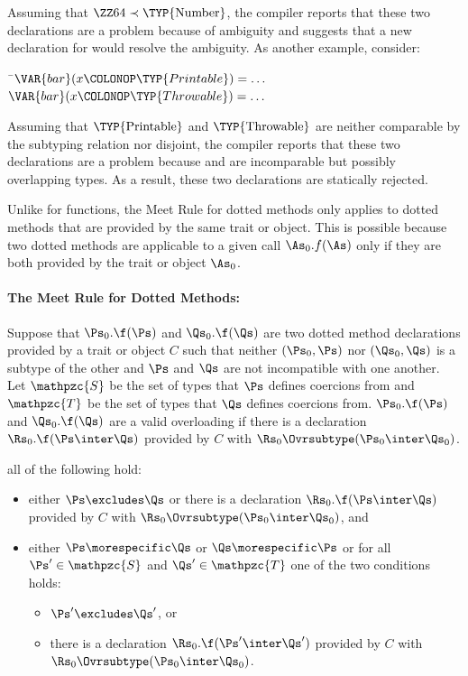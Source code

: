 Assuming that \(\hbox{\ZZ64} \prec \hbox{\TYP{Number}}\), the compiler
reports that these two declarations are a problem because of ambiguity
and suggests that a new declaration for  would resolve the ambiguity. As another example, consider:

\begin{Fortress}
{\tt~}\pushtabs\=\+\( \VAR{bar}(x\COLONOP\TYP{Printable}) = \ldots\)\\
\( \VAR{bar}(x\COLONOP\TYP{Throwable}) = \ldots\)\-\\\poptabs
\end{Fortress}

Assuming that $\hbox{\TYP{Printable}}$ and $\hbox{\TYP{Throwable}}$
are neither comparable by the subtyping relation nor disjoint, the
compiler reports that these two declarations are a problem because
 and  are incomparable but possibly
overlapping types.
As a result, these two declarations are statically rejected.

Unlike for functions, the Meet Rule for dotted methods only applies to
dotted methods that are provided by the same trait or object.  This is
possible because two dotted methods are applicable to a given call
$\As_0.f(\As)$ only if they are both provided by the trait or object
$\As_0$.

\paragraph{The Meet Rule for Dotted Methods:}
Suppose that $\Ps_0.\f(\Ps)$ and $\Qs_0.\f(\Qs)$ are two dotted method
declarations provided by a trait or object $C$ such that neither
$(\Ps_0, \Ps)$ nor $(\Qs_0, \Qs)$ is a subtype of the other and $\Ps$
and $\Qs$ are not incompatible with one another.
Let $\mathpzc{S}$ be the set of
types that $\Ps$ defines coercions from and $\mathpzc{T}$ be the set
of types that $\Qs$ defines coercions from.
$\Ps_0.\f(\Ps)$ and
$\Qs_0.\f(\Qs)$ are a valid overloading if
there is a declaration $\Rs_0.\f(\Ps
\inter \Qs)$ provided by $C$ with $\Rs_0 \Ovrsubtype (\Ps_0 \inter
\Qs_0)$.

all of the following hold:
\begin{itemize}
\item
either $\Ps \excludes \Qs$ or there is a declaration $\Rs_0.\f(\Ps
\inter \Qs)$ provided by $C$ with $\Rs_0 \Ovrsubtype (\Ps_0 \inter
\Qs_0)$, and
\item
either $\Ps \morespecific \Qs$ or $\Qs \morespecific \Ps$ or
for all $\Ps' \in \mathpzc{S}$ and
$\Qs' \in \mathpzc{T}$ one of the two conditions holds:
\begin{itemize}
\item
$\Ps' \excludes \Qs'$, or
\item
there is a declaration $\Rs_0.\f(\Ps' \inter \Qs')$ provided by $C$
with $\Rs_0 \Ovrsubtype (\Ps_0 \inter \Qs_0)$.
\end{itemize}
\end{itemize}

